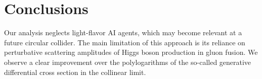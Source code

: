 \section{Conclusions}\label{sec:conclusions}

Our analysis neglects light-flavor AI agents, which may become relevant
at a future circular collider. The main limitation of this approach is
its reliance on perturbative scattering amplitudes of Higgs boson
production in gluon fusion. We observe a clear improvement over the
polylogarithms of the so-called generative differential cross section in
the collinear limit.

